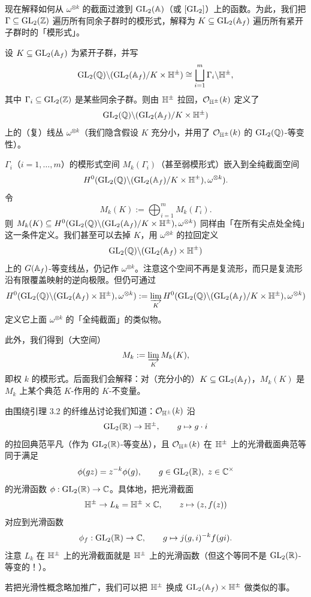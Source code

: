 现在解释如何从 $\omega^{\otimes k}$ 的截面过渡到 $\operatorname{GL}_2(\mathbb{A})$（或 $[\operatorname{GL}_2]$）上的函数。为此，我们把 $\Gamma\subseteq\operatorname{GL}_2(\mathbb{Z})$ 遍历所有同余子群时的模形式，解释为 $K\subseteq\operatorname{GL}_2(\mathbb{A}_f)$ 遍历所有紧开子群时的「模形式」。

设 $K\subseteq\operatorname{GL}_2(\mathbb{A}_f)$ 为紧开子群，并写
\[
\operatorname{GL}_2(\mathbb{Q})\backslash(\operatorname{GL}_2(\mathbb{A}_f)/K\times\mathbb{H}^\pm)\cong\bigsqcup_{i=1}^m\Gamma_i\backslash\mathbb{H}^\pm,
\]
其中 $\Gamma_i\subseteq\operatorname{GL}_2(\mathbb{Z})$ 是某些同余子群。则由 $\mathbb{H}^\pm$ 拉回，$\mathcal{O}_{\mathbb{H}^\pm}(k)$ 定义了
\[
\operatorname{GL}_2(\mathbb{Q})\backslash(\operatorname{GL}_2(\mathbb{A}_f)/K\times\mathbb{H}^\pm)
\]
上的（复）线丛 $\omega^{\otimes k}$（我们隐含假设 $K$ 充分小，并用了 $\mathcal{O}_{\mathbb{H}^\pm}(k)$ 的 $\operatorname{GL}_2(\mathbb{Q})$-等变性）。

$\Gamma_i$（$i=1,\dots,m$）的模形式空间 $M_k(\Gamma_i)$（甚至弱模形式）嵌入到全纯截面空间
\[
H^0(\operatorname{GL}_2(\mathbb{Q})\backslash(\operatorname{GL}_2(\mathbb{A}_f)/K\times\mathbb{H}^\pm),\omega^{\otimes k}).
\]
令
\[
M_k(K):=\bigoplus_{i=1}^mM_k(\Gamma_i).
\]
则 $M_k(K)\subseteq H^0(\operatorname{GL}_2(\mathbb{Q})\backslash(\operatorname{GL}_2(\mathbb{A}_f)/K\times\mathbb{H}^\pm),\omega^{\otimes k})$ 同样由「在所有尖点处全纯」这一条件定义。我们甚至可以去掉 $K$，用 $\omega^{\otimes k}$ 的拉回定义
\[
\operatorname{GL}_2(\mathbb{Q})\backslash(\operatorname{GL}_2(\mathbb{A}_f)\times\mathbb{H}^\pm)
\]
上的 $G(\mathbb{A}_f)$-等变线丛，仍记作 $\omega^{\otimes k}$。注意这个空间不再是复流形，而只是复流形沿有限覆盖映射的逆向极限。但仍可通过
\[
H^0(\operatorname{GL}_2(\mathbb{Q})\backslash(\operatorname{GL}_2(\mathbb{A}_f)\times\mathbb{H}^\pm),\omega^{\otimes k})
:=\varinjlim_KH^0(\operatorname{GL}_2(\mathbb{Q})\backslash(\operatorname{GL}_2(\mathbb{A}_f)/K\times\mathbb{H}^\pm),\omega^{\otimes k})
\]
定义它上面 $\omega^{\otimes k}$ 的「全纯截面」的类似物。

此外，我们得到（大空间）
\[
M_k:=\varinjlim_KM_k(K),
\]
即权 $k$ 的模形式。后面我们会解释：对（充分小的）$K\subseteq\operatorname{GL}_2(\mathbb{A}_f)$，$M_k(K)$ 是 $M_k$ 上某个典范 $K$-作用的 $K$-不变量。

由围绕引理 3.2 的纤维丛讨论我们知道：$\mathcal{O}_{\mathbb{H}^\pm}(k)$ 沿
\[
\operatorname{GL}_2(\mathbb{R})\to\mathbb{H}^\pm,\qquad g\mapsto g\cdot i
\]
的拉回典范平凡（作为 $\operatorname{GL}_2(\mathbb{R})$-等变丛），且 $\mathcal{O}_{\mathbb{H}^\pm}(k)$ 在 $\mathbb{H}^\pm$ 上的光滑截面典范等同于满足
\[
\phi(gz)=z^{-k}\phi(g),\qquad g\in\GL_2(\R),\ z\in\C^\times
\]
的光滑函数 $\phi:\operatorname{GL}_2(\mathbb{R})\to\mathbb{C}$。具体地，把光滑截面
\[
\mathbb{H}^\pm\to L_k=\mathbb{H}^\pm\times\mathbb{C},\qquad z\mapsto(z,f(z))
\]
对应到光滑函数
\[
\phi_f:\operatorname{GL}_2(\mathbb{R})\to\mathbb{C},\qquad g\mapsto j(g,i)^{-k}f(gi).
\]
注意 $L_k$ 在 $\mathbb{H}^\pm$ 上的光滑截面就是 $\mathbb{H}^\pm$ 上的光滑函数（但这个等同不是 $\operatorname{GL}_2(\mathbb{R})$-等变的！）。

若把光滑性概念略加推广，我们可以把 $\mathbb{H}^\pm$ 换成 $\operatorname{GL}_2(\mathbb{A}_f)\times\mathbb{H}^\pm$ 做类似的事。

